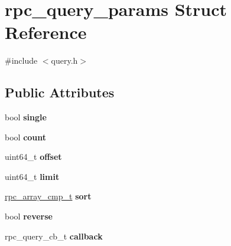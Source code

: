 \hypertarget{structrpc__query__params}{\section{rpc\-\_\-query\-\_\-params Struct Reference}
\label{structrpc__query__params}
}


{\ttfamily \#include $<$query.\-h$>$}

\subsection*{Public Attributes}
\begin{DoxyCompactItemize}
\item 
\hypertarget{structrpc__query__params_a6e4eafac062b7f7490a4983d56296385}{bool {\bfseries single}}\label{structrpc__query__params_a6e4eafac062b7f7490a4983d56296385}

\item 
\hypertarget{structrpc__query__params_a7b488114aeb262c508dd28acc1a7fc95}{bool {\bfseries count}}\label{structrpc__query__params_a7b488114aeb262c508dd28acc1a7fc95}

\item 
\hypertarget{structrpc__query__params_a4e33edf4295472adcc84d6d1ccee2ddd}{uint64\-\_\-t {\bfseries offset}}\label{structrpc__query__params_a4e33edf4295472adcc84d6d1ccee2ddd}

\item 
\hypertarget{structrpc__query__params_a89ee7bc896675c8c2ef148436430ba0a}{uint64\-\_\-t {\bfseries limit}}\label{structrpc__query__params_a89ee7bc896675c8c2ef148436430ba0a}

\item 
\hypertarget{structrpc__query__params_a661d864b8637b469fd99f3b7392aa507}{\hyperlink{object_8h_a23bdaa1b433c1ae44515a60f06a86866}{rpc\-\_\-array\-\_\-cmp\-\_\-t} {\bfseries sort}}\label{structrpc__query__params_a661d864b8637b469fd99f3b7392aa507}

\item 
\hypertarget{structrpc__query__params_ad50d1e6e25322f5562ec1793647c1618}{bool {\bfseries reverse}}\label{structrpc__query__params_ad50d1e6e25322f5562ec1793647c1618}

\item 
\hypertarget{structrpc__query__params_ab8b50541840d07c084797048d22d589a}{rpc\-\_\-query\-\_\-cb\-\_\-t {\bfseries callback}}\label{structrpc__query__params_ab8b50541840d07c084797048d22d589a}

\end{DoxyCompactItemize}


